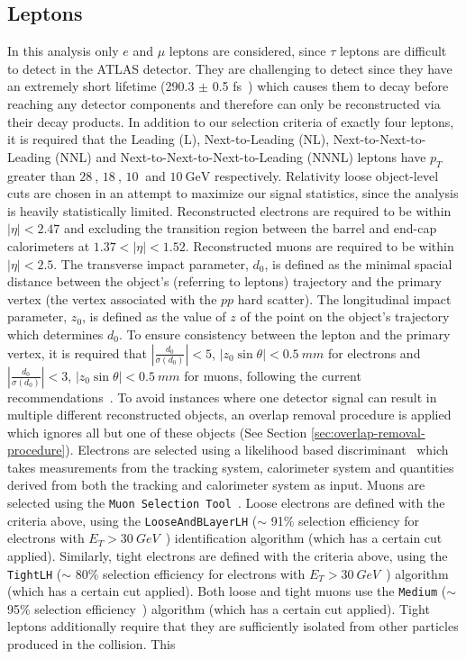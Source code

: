 \subsection{Leptons}
\label{sec:lepton-object}
In this analysis only $e$ and $\mu$ leptons are considered, since $\tau$ leptons are difficult to detect in the ATLAS detector. They are challenging to detect since they have an extremely short lifetime (290.3 $\pm$ 0.5 fs~\cite{pdg}) which causes them to decay before reaching any detector components and therefore can only be reconstructed via their decay products. In addition to our selection criteria of exactly four leptons, it is required that the Leading (L), Next-to-Leading (NL), Next-to-Next-to-Leading (NNL) and Next-to-Next-to-Next-to-Leading (NNNL) leptons have $p_{T}$ greater than $\SI{28}{}$, $\SI{18}{}$, $\SI{10}{}$ and $\SI{10}{\GeV}$ respectively. Relativity loose object-level cuts are chosen in an attempt to maximize our signal statistics, since the analysis is heavily statistically limited. Reconstructed electrons are required to be within $|\eta| < 2.47$ and excluding the transition region between the barrel and end-cap calorimeters at $1.37 < |\eta| < 1.52$. Reconstructed muons are required to be within $|\eta| < 2.5$. The transverse impact parameter, $d_{0}$, is defined as the minimal spacial distance between the object's (referring to leptons) trajectory and the primary vertex (the vertex associated with the $pp$ hard scatter). The longitudinal impact parameter, $z_{0}$, is defined as the value of $z$ of the point on the object's trajectory which determines $d_{0}$. To ensure consistency between the lepton and the primary vertex, it is required that $|\frac{d_{0}}{\sigma(d_{0})}| < 5$, $|z_{0}\sin{\theta}| < \SI{0.5}{mm}$ for electrons and $|\frac{d_{0}}{\sigma(d_{0})}| < 3$, $|z_{0}\sin{\theta}| < \SI{0.5}{mm}$ for muons, following the current recommendations~\cite{TopRecoObjTwikiModel}. To avoid instances where one detector signal can result in multiple different reconstructed objects, an overlap removal procedure is applied which ignores all but one of these objects (See Section \ref{sec:overlap-removal-procedure}). Electrons are selected using a likelihood based discriminant~\cite{electronRecoAndID:paper} which takes measurements from the tracking system, calorimeter system and quantities derived from both the tracking and calorimeter system as input. Muons are selected using the \texttt{Muon Selection Tool}~\cite{muon-selection-tool}. Loose electrons are defined with the criteria above, using the \texttt{LooseAndBLayerLH} ($\sim$ 91$\%$ selection efficiency for electrons with $E_{T} > \SI{30}{GeV}$~\cite{electronIDefficiency}) identification algorithm (which has a certain cut applied). Similarly, tight electrons are defined with the criteria above, using the \texttt{TightLH} ($\sim$ 80$\%$ selection efficiency for electrons with $E_{T} > \SI{30}{GeV}$~\cite{electronIDefficiency}) algorithm (which has a certain cut applied). Both loose and tight muons use the \texttt{Medium} ($\sim$ 95$\%$ selection efficiency~\cite{muonIDEfficiency}) algorithm (which has a certain cut applied). Tight leptons additionally require that they are sufficiently isolated from other particles produced in the collision. This 